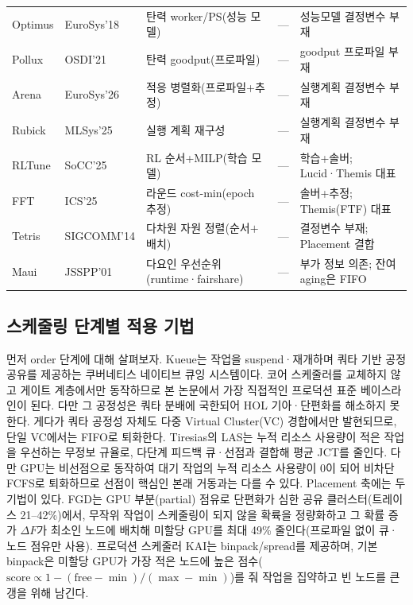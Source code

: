 \documentclass{ieeetj}
\begin{document}
\begin{table}[htb!]
\begin{tabular}{@{}lllcl@{}}
Optimus\cite{peng2018optimus} & EuroSys'18 & 탄력 worker/PS(성능 모델) & --- & 성능모델 결정변수 부재\\
Pollux\cite{qiao2021pollux} & OSDI'21 & 탄력 goodput(프로파일) & --- & goodput 프로파일 부재\\
Arena\cite{arena2026} & EuroSys'26 & 적응 병렬화(프로파일+추정) & --- & 실행계획 결정변수 부재\\
Rubick\cite{rubick2025} & MLSys'25 & 실행 계획 재구성 & --- & 실행계획 결정변수 부재\\
RLTune\cite{rltune2025} & SoCC'25 & RL 순서+MILP(학습 모델) & --- & 학습+솔버; Lucid·Themis 대표\\
FFT\cite{fft2025} & ICS'25 & 라운드 cost-min(epoch 추정) & --- & 솔버+추정; Themis(FTF) 대표\\
Tetris\cite{grandl2014multi} & SIGCOMM'14 & 다차원 자원 정렬(순서$+$배치) & --- & 결정변수 부재; Placement 결합\\
Maui\cite{jackson2001maui} & JSSPP'01 & 다요인 우선순위(runtime·fairshare) & --- & 부가 정보 의존; 잔여 aging은 FIFO\\
\bottomrule
\end{tabular}
\end{table}

\subsection{스케줄링 단계별 적용 기법} 
먼저 order 단계에 대해 살펴보자. Kueue\cite{kueue2024}는 작업을 suspend·재개하며 쿼타 기반 공정 공유를 제공하는 쿠버네티스 네이티브 큐잉 시스템이다. 코어 스케줄러를 교체하지 않고 게이트 계층에서만 동작하므로 본 논문에서 가장 직접적인 프로덕션 표준 베이스라인이 된다. 다만 그 공정성은 쿼타 분배에 국한되어 HOL 기아·단편화를 해소하지 못한다. 게다가 쿼타 공정성 자체도 다중 Virtual Cluster(VC) 경합에서만 발현되므로, 단일 VC에서는 FIFO로 퇴화한다. Tiresias\cite{gu2019tiresias}의 LAS는 누적 리소스 사용량이 적은 작업을 우선하는 무정보 규율로, 다단계 피드백 큐·선점과 결합해 평균 JCT를 줄인다. 다만 GPU는 비선점으로 동작하여 대기 작업의 누적 리소스 사용량이 0이 되어 비차단 FCFS로 퇴화하므로 선점이 핵심인 본래 거동과는 다를 수 있다. Placement 축에는 두 기법이 있다. FGD\cite{weng2023beware}는 GPU 부분(partial) 점유로 단편화가 심한 공유 클러스터(트레이스 21--42\%)에서, 무작위 작업이 스케줄링이 되지 않을 확륙을 정량화하고 그 확률 증가 $\Delta F$가 최소인 노드에 배치해 미할당 GPU를 최대 49\% 줄인다(프로파일 없이 큐·노드 점유만 사용). 프로덕션 스케줄러 KAI\cite{kai2025}는 binpack/spread를 제공하며, 기본 binpack은 미할당 GPU가 가장 적은 노드에 높은 점수($\text{score}\propto 1-(\text{free}-\min)/(\max-\min)$)를 줘 작업을 집약하고 빈 노드를 큰 갱을 위해 남긴다.
\end{document}
